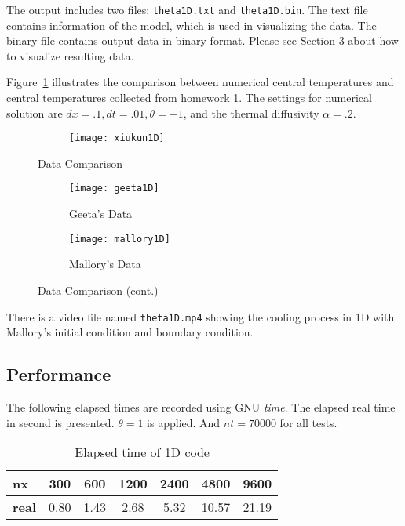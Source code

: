 \documentclass[letterpaper,12pt,fleqn]{article}
\begin{document}
The output includes two files: \texttt{theta1D.txt} and \texttt{theta1D.bin}.
The text file contains information of the model, which is used in visualizing the data.
The binary file contains output data in binary format.
Please see Section 3 about how to visualize resulting data.

Figure~\ref{fig:data-comp-1d} illustrates the comparison between numerical central temperatures and central temperatures collected from homework 1.
The settings for numerical solution are $dx=.1, dt=.01, \theta=-1$, and the thermal diffusivity $\alpha=.2$.

\begin{figure}[H]
  \begin{subfigure}[b]{\textwidth}
    \centering
    \texttt{[image: xiukun1D]}
  \end{subfigure}
  \caption{Data Comparison}
\end{figure}
\begin{figure}[H]\ContinuedFloat
  \begin{subfigure}[b]{\textwidth}
    \centering
    \texttt{[image: geeta1D]}
    \caption{Geeta's Data}
  \end{subfigure}

  \begin{subfigure}[b]{\textwidth}
    \centering
    \texttt{[image: mallory1D]}
    \caption{Mallory's Data}
  \end{subfigure}
  \caption{Data Comparison (cont.)}
  \label{fig:data-comp-1d}
\end{figure}
There is a video file named \texttt{theta1D.mp4} showing the cooling process in 1D with Mallory's initial condition and boundary condition.


\subsection{Performance}
The following elapsed times are recorded using GNU \textit{time}. 
The elapsed real time in second is presented.
$\theta=1$ is applied. And $nt=70000$ for all tests.

\begin{table}[H]
  \centering
  \begin{tabular}{l c c c c c c}
    \toprule
    \textbf{nx} & 300 & 600 & 1200 & 2400 & 4800 & 9600\\
    \midrule
    \textbf{real} & 0.80 & 1.43 & 2.68 & 5.32 & 10.57 & 21.19\\
    \bottomrule
  \end{tabular}
  \caption{Elapsed time of 1D code}
  \label{tab:time-1d}
\end{table}
\end{document}
